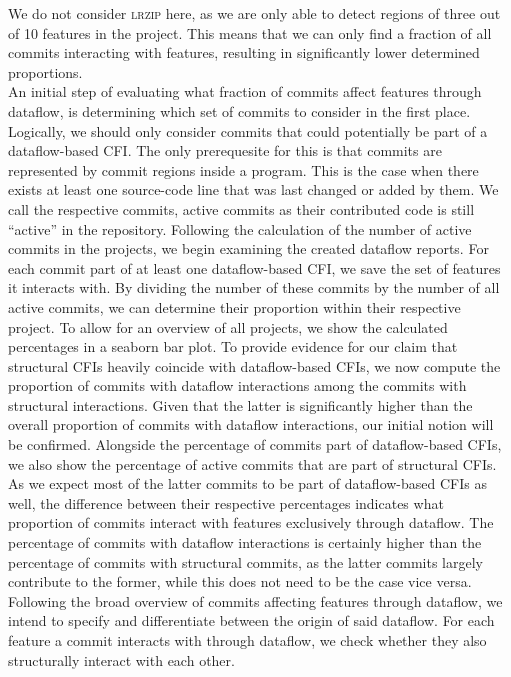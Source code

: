 We do not consider \textsc{lrzip} here, as we are only able to detect regions of three out of 10 features in the project.
This means that we can only find a fraction of all commits interacting with features, resulting in significantly lower determined proportions. \\
An initial step of evaluating what fraction of commits affect features through dataflow, is determining which set of commits to consider in the first place.
Logically, we should only consider commits that could potentially be part of a dataflow-based CFI.
The only prerequesite for this is that commits are represented by commit regions inside a program.
This is the case when there exists at least one source-code line that was last changed or added by them.
We call the respective commits, \textsf{active} commits as their contributed code is still ``active'' in the repository.
Following the calculation of the number of active commits in the projects, we begin examining the created dataflow reports.
For each commit part of at least one dataflow-based CFI, we save the set of features it interacts with.
By dividing the number of these commits by the number of all active commits, we can determine their proportion within their respective project.
To allow for an overview of all projects, we show the calculated percentages in a \textsf{seaborn} bar plot.
To provide evidence for our claim that structural CFIs heavily coincide with dataflow-based CFIs, we now compute the proportion of commits with dataflow interactions among the commits with structural interactions.
Given that the latter is significantly higher than the overall proportion of commits with dataflow interactions, our initial notion will be confirmed.
Alongside the percentage of commits part of dataflow-based CFIs, we also show the percentage of active commits that are part of structural CFIs.
As we expect most of the latter commits to be part of dataflow-based CFIs as well, the difference between their respective percentages indicates what proportion of commits interact with features exclusively through dataflow.
The percentage of commits with dataflow interactions is certainly higher than the percentage of commits with structural commits, as the latter commits largely contribute to the former, while this does not need to be the case vice versa.
Following the broad overview of commits affecting features through dataflow, we intend to specify and differentiate between the origin of said dataflow.
For each feature a commit interacts with through dataflow, we check whether they also structurally interact with each other.
